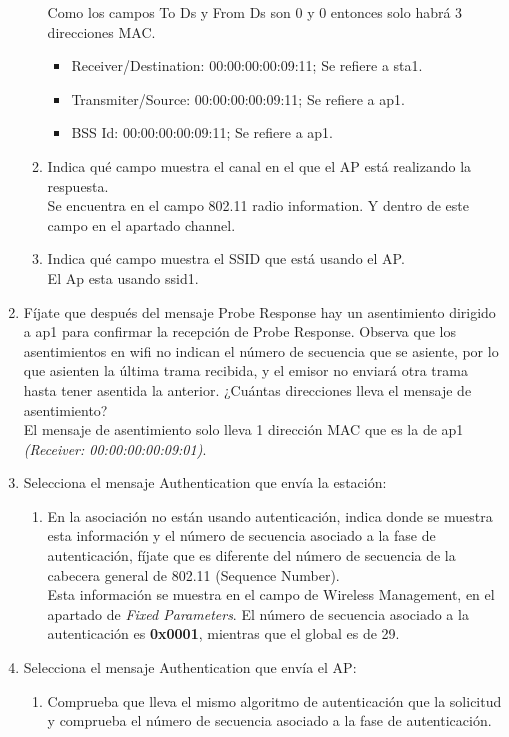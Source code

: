 \documentclass[12pt, a4paper]{report}
\begin{document}
\begin{enumerate}
\begin{enumerate}[label=\alph*)]
		Como los campos To Ds y From Ds son 0 y 0 entonces solo habrá 3 direcciones MAC.
		
		\begin{itemize}
			\item Receiver/Destination: 00:00:00:00:09:11; Se refiere a sta1.\\
			\item Transmiter/Source: 00:00:00:00:09:11; Se refiere a ap1.\\
			\item BSS Id: 00:00:00:00:09:11; Se refiere a ap1. \\
		\end{itemize}
		\item Indica qué campo muestra el canal en el que el AP está realizando la respuesta.\\
		
		Se encuentra en el campo 802.11 radio information. Y dentro de este campo en el apartado channel.
		\item Indica qué campo muestra el SSID que está usando el AP.\\
		
		El Ap esta usando ssid1.
	\end{enumerate}
	\item Fíjate que después del mensaje Probe Response hay un asentimiento dirigido a ap1 para confirmar la recepción de Probe Response. Observa que los asentimientos en wifi no indican el
	número de secuencia que se asiente, por lo que asienten la última trama recibida, y el emisor
	no enviará otra trama hasta tener asentida la anterior. ¿Cuántas direcciones lleva el mensaje de
	asentimiento?\\
	
	El mensaje de asentimiento solo lleva 1 dirección MAC que es la de ap1 \textit{(Receiver: 00:00:00:00:09:01)}.
	\item Selecciona el mensaje Authentication que envía la estación:
	\begin{enumerate}[label=\alph*)]
		\item En la asociación no están usando autenticación, indica donde se muestra esta información y
		el número de secuencia asociado a la fase de autenticación, fíjate que es diferente del número
		de secuencia de la cabecera general de 802.11 (Sequence Number).\\
		
		Esta información se muestra en el campo de Wireless Management, en el apartado de \textit{Fixed Parameters}.
		El número de secuencia asociado a la autenticación es \textbf{0x0001}, mientras que el global es de 29.
	\end{enumerate}
	\item Selecciona el mensaje Authentication que envía el AP:
	\begin{enumerate}[label=\alph*)]
		\item Comprueba que lleva el mismo algoritmo de autenticación que la solicitud y comprueba el
		número de secuencia asociado a la fase de autenticación.\\
		

\end{enumerate}
\end{enumerate}
\end{document}
